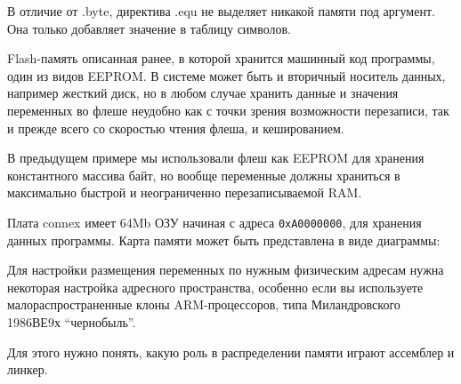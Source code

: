 \begin{framed}
В отличие от .byte, директива .equ не выделяет никакой памяти под аргумент.
Она только добавляет значение в таблицу символов.  
\end{framed}

\secup

\secup
{}

Flash-память описанная ранее, в которой хранится машинный код программы, один из
видов EEPROM.
В системе может быть и вторичный носитель данных, например жесткий диск, но в
любом случае хранить данные и значения переменных во флеше неудобно как с точки
зрения возможности перезаписи, так и прежде всего со скоростью чтения флеша, и
кешированием.

В предыдущем примере мы использовали флеш как EEPROM для хранения константного
массива байт, но вообще переменные должны храниться в максимально быстрой и
неограниченно перезаписываемой RAM.

Плата connex имеет 64Mb ОЗУ начиная с адреса \verb|0xA0000000|, для хранения
данных программы. Карта памяти может быть представлена в виде диаграммы:



Для настройки размещения переменных по нужным физическим адресам нужна некоторая
настройка адресного пространства, особенно если вы используете
малораспространенные клоны ARM-процессоров, типа Миландровского 1986ВЕ9х
``чернобыль''.

Для этого нужно понять, какую роль в распределении памяти играют ассемблер и
линкер.


\secdown
{}
\secup
{}\secdown
{}
\secup
{}\secdown
{}
\secup
{}
\secdown
{}
\secup
{}
\secdown
{}
\secup
{}
\label{kumarB}
 
\secup 
